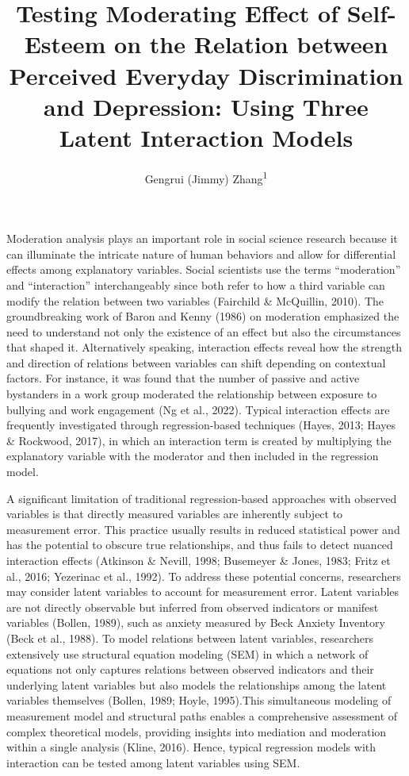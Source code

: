\documentclass[
  man]{apa7}
\title{Testing Moderating Effect of Self-Esteem on the Relation between Perceived Everyday Discrimination and Depression: Using Three Latent Interaction Models}
\author{Gengrui (Jimmy) Zhang\textsuperscript{1}}
\date{}
\affiliation{\vspace{0.5cm}\textsuperscript{1} University of Southhern California}
\begin{document}
\maketitle

Moderation analysis plays an important role in social science research because it can illuminate the intricate nature of human behaviors and allow for differential effects among explanatory variables. Social scientists use the terms ``moderation'' and ``interaction'' interchangeably since both refer to how a third variable can modify the relation between two variables (Fairchild \& McQuillin, 2010). The groundbreaking work of Baron and Kenny (1986) on moderation emphasized the need to understand not only the existence of an effect but also the circumstances that shaped it. Alternatively speaking, interaction effects reveal how the strength and direction of relations between variables can shift depending on contextual factors. For instance, it was found that the number of passive and active bystanders in a work group moderated the relationship between exposure to bullying and work engagement (Ng et al., 2022). Typical interaction effects are frequently investigated through regression-based techniques (Hayes, 2013; Hayes \& Rockwood, 2017), in which an interaction term is created by multiplying the explanatory variable with the moderator and then included in the regression model.

A significant limitation of traditional regression-based approaches with observed variables is that directly measured variables are inherently subject to measurement error. This practice usually results in reduced statistical power and has the potential to obscure true relationships, and thus fails to detect nuanced interaction effects (Atkinson \& Nevill, 1998; Busemeyer \& Jones, 1983; Fritz et al., 2016; Yezerinac et al., 1992). To address these potential concerns, researchers may consider latent variables to account for measurement error. Latent variables are not directly observable but inferred from observed indicators or manifest variables (Bollen, 1989), such as anxiety measured by Beck Anxiety Inventory (Beck et al., 1988). To model relations between latent variables, researchers extensively use structural equation modeling (SEM) in which a network of equations not only captures relations between observed indicators and their underlying latent variables but also models the relationships among the latent variables themselves (Bollen, 1989; Hoyle, 1995).This simultaneous modeling of measurement model and structural paths enables a comprehensive assessment of complex theoretical models, providing insights into mediation and moderation within a single analysis (Kline, 2016). Hence, typical regression models with interaction can be tested among latent variables using SEM.
\end{document}
